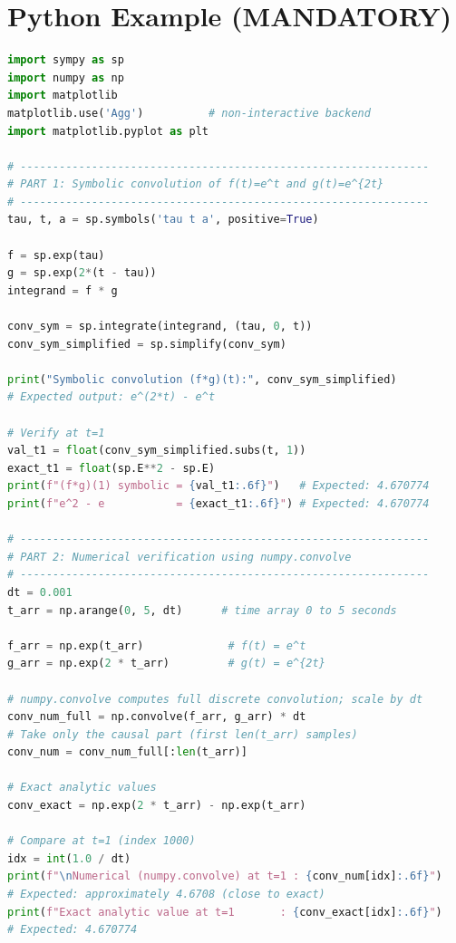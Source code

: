 \documentclass[12pt,a4paper]{article}
\begin{document}
\section{Python Example (MANDATORY)}

\begin{lstlisting}[language=Python, caption={Convolution Theorem --- Symbolic and Numerical Verification}]
import sympy as sp
import numpy as np
import matplotlib
matplotlib.use('Agg')          # non-interactive backend
import matplotlib.pyplot as plt

# ---------------------------------------------------------------
# PART 1: Symbolic convolution of f(t)=e^t and g(t)=e^{2t}
# ---------------------------------------------------------------
tau, t, a = sp.symbols('tau t a', positive=True)

f = sp.exp(tau)
g = sp.exp(2*(t - tau))
integrand = f * g

conv_sym = sp.integrate(integrand, (tau, 0, t))
conv_sym_simplified = sp.simplify(conv_sym)

print("Symbolic convolution (f*g)(t):", conv_sym_simplified)
# Expected output: e^(2*t) - e^t

# Verify at t=1
val_t1 = float(conv_sym_simplified.subs(t, 1))
exact_t1 = float(sp.E**2 - sp.E)
print(f"(f*g)(1) symbolic = {val_t1:.6f}")   # Expected: 4.670774
print(f"e^2 - e           = {exact_t1:.6f}") # Expected: 4.670774

# ---------------------------------------------------------------
# PART 2: Numerical verification using numpy.convolve
# ---------------------------------------------------------------
dt = 0.001
t_arr = np.arange(0, 5, dt)      # time array 0 to 5 seconds

f_arr = np.exp(t_arr)             # f(t) = e^t
g_arr = np.exp(2 * t_arr)         # g(t) = e^{2t}

# numpy.convolve computes full discrete convolution; scale by dt
conv_num_full = np.convolve(f_arr, g_arr) * dt
# Take only the causal part (first len(t_arr) samples)
conv_num = conv_num_full[:len(t_arr)]

# Exact analytic values
conv_exact = np.exp(2 * t_arr) - np.exp(t_arr)

# Compare at t=1 (index 1000)
idx = int(1.0 / dt)
print(f"\nNumerical (numpy.convolve) at t=1 : {conv_num[idx]:.6f}")
# Expected: approximately 4.6708 (close to exact)
print(f"Exact analytic value at t=1       : {conv_exact[idx]:.6f}")
# Expected: 4.670774


\end{lstlisting}
\end{document}
